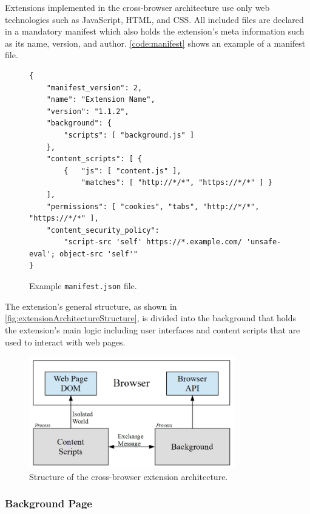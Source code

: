 	Extensions implemented in the cross-browser architecture use only web technologies such as JavaScript, HTML, and CSS. All included files are declared in a mandatory manifest which also holds the extension's meta information such as its name, version, and author. \autoref{code:manifest} shows an example of a manifest file. 

	\begin{figure}[h]
		\begin{lstlisting}
{
	"manifest_version": 2,
	"name": "Extension Name",
	"version": "1.1.2",
	"background": {
		"scripts": [ "background.js" ]
	},
	"content_scripts": [ {
		{ 	"js": [ "content.js" ],
			"matches": [ "http://*/*", "https://*/*" ] }
	],
	"permissions": [ "cookies", "tabs", "http://*/*", "https://*/*" ],
	"content_security_policy": 
		"script-src 'self' https://*.example.com/ 'unsafe-eval'; object-src 'self'"
}
\end{lstlisting}
		\caption{Example \texttt{manifest.json} file.}
		\label{code:manifest}
	\end{figure}
	
	The extension's general structure, as shown in \autoref{fig:extensionArchitectureStructure}, is divided into the background that holds the extension's main logic including user interfaces and content scripts that are used to interact with web pages.
	
	\begin{figure}[h]
		\centering
		\includegraphics[width=0.8\textwidth]{./graphics/extension_overview.jpeg}
		\caption{Structure of the cross-browser extension architecture.}
		\label{fig:extensionArchitectureStructure}
	\end{figure}
		
	
\subsubsection{Background Page}

